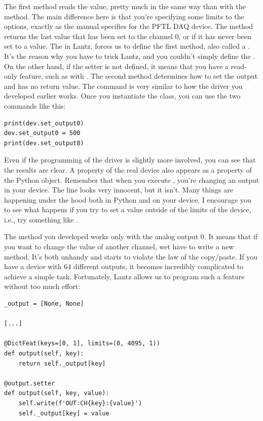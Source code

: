 The first method reads the value, pretty much in the same way than with the  method. The main difference here is that you're specifying some limits to the options, exactly as the manual specifies for the {PFTL DAQ} device. The method  returns the last value that has been set to the channel 0, or  if it has never been set to a value. The  in Lantz, forces us to define the first method, also called a . It's the reason why you have to trick Lantz, and you couldn't simply define the . On the other hand, if the setter is not defined, it means that you have a read-only feature, such as with . The second method determines how to set the output and has no return value. The command is very similar to how the driver you developed earlier works. Once you instantiate the class, you can use the two commands like this:

\begin{verbatim}
print(dev.set_output0)
dev.set_output0 = 500
print(dev.set_output0)
\end{verbatim}

Even if the programming of the driver is slightly more involved, you can see that the results are clear. A property of the real device also appears as a property of the Python object. Remember that when you execute , you're changing an output in your device. The line looks very innocent, but it isn't. Many things are happening under the hood both in Python and on your device. I encourage you to see what happens if you try to set a value outside of the limits of the device, i.e., try something like .

The method you developed works only with the analog output 0. It means that if you want to change the value of another channel, wet have to write a new method. It's both unhandy and starts to violate the law of the copy/paste. If you have a device with 64 different outputs, it becomes incredibly complicated to achieve a simple task. Fortunately, Lantz allows us to program such a feature without too much effort:

\begin{verbatim}
_output = [None, None]

[...]

@DictFeat(keys=[0, 1], limits=(0, 4095, 1))
def output(self, key):
    return self._output[key]

@output.setter
def output(self, key, value):
    self.write(f'OUT:CH{key}:{value}')
    self._output[key] = value
\end{verbatim}

